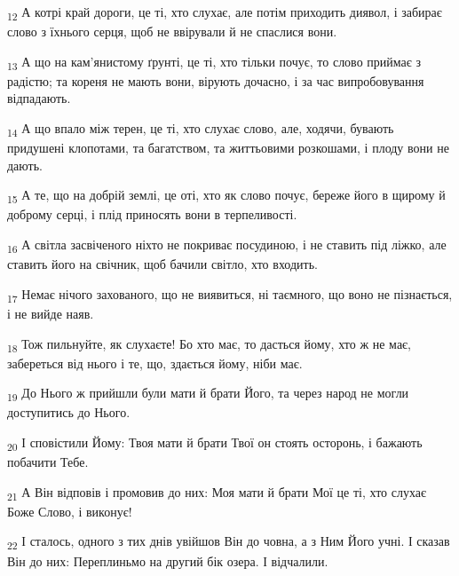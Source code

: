 \begin{tcolorbox}
\textsubscript{12} А котрі край дороги, це ті, хто слухає, але потім приходить диявол, і забирає слово з їхнього серця, щоб не ввірували й не спаслися вони.
\end{tcolorbox}
\begin{tcolorbox}
\textsubscript{13} А що на кам'янистому ґрунті, це ті, хто тільки почує, то слово приймає з радістю; та кореня не мають вони, вірують дочасно, і за час випробовування відпадають.
\end{tcolorbox}
\begin{tcolorbox}
\textsubscript{14} А що впало між терен, це ті, хто слухає слово, але, ходячи, бувають придушені клопотами, та багатством, та життьовими розкошами, і плоду вони не дають.
\end{tcolorbox}
\begin{tcolorbox}
\textsubscript{15} А те, що на добрій землі, це оті, хто як слово почує, береже його в щирому й доброму серці, і плід приносять вони в терпеливості.
\end{tcolorbox}
\begin{tcolorbox}
\textsubscript{16} А світла засвіченого ніхто не покриває посудиною, і не ставить під ліжко, але ставить його на свічник, щоб бачили світло, хто входить.
\end{tcolorbox}
\begin{tcolorbox}
\textsubscript{17} Немає нічого захованого, що не виявиться, ні таємного, що воно не пізнається, і не вийде наяв.
\end{tcolorbox}
\begin{tcolorbox}
\textsubscript{18} Тож пильнуйте, як слухаєте! Бо хто має, то дасться йому, хто ж не має, забереться від нього і те, що, здається йому, ніби має.
\end{tcolorbox}
\begin{tcolorbox}
\textsubscript{19} До Нього ж прийшли були мати й брати Його, та через народ не могли доступитись до Нього.
\end{tcolorbox}
\begin{tcolorbox}
\textsubscript{20} І сповістили Йому: Твоя мати й брати Твої он стоять осторонь, і бажають побачити Тебе.
\end{tcolorbox}
\begin{tcolorbox}
\textsubscript{21} А Він відповів і промовив до них: Моя мати й брати Мої це ті, хто слухає Боже Слово, і виконує!
\end{tcolorbox}
\begin{tcolorbox}
\textsubscript{22} І сталось, одного з тих днів увійшов Він до човна, а з Ним Його учні. І сказав Він до них: Переплиньмо на другий бік озера. І відчалили.
\end{tcolorbox}
